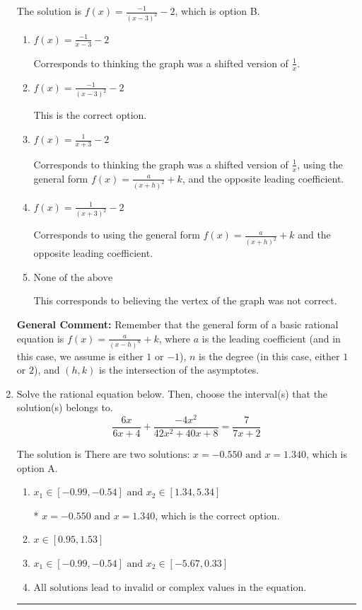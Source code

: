\documentclass{extbook}[14pt]
\newcommand{\litem}[1]{\item #1

\rule{\textwidth}{0.4pt}}
\begin{document}
\begin{enumerate}
{The solution is \( f(x) = \frac{-1}{(x - 3)^2} - 2 \), which is option B.\begin{enumerate}[label=\Alph*.]
\item \( f(x) = \frac{-1}{x - 3} - 2 \)

Corresponds to thinking the graph was a shifted version of $\frac{1}{x}$.
\item \( f(x) = \frac{-1}{(x - 3)^2} - 2 \)

This is the correct option.
\item \( f(x) = \frac{1}{x + 3} - 2 \)

Corresponds to thinking the graph was a shifted version of $\frac{1}{x}$, using the general form $f(x) = \frac{a}{(x+h)^2}+k$, and the opposite leading coefficient.
\item \( f(x) = \frac{1}{(x + 3)^2} - 2 \)

Corresponds to using the general form $f(x) = \frac{a}{(x+h)^2}+k$ and the opposite leading coefficient.
\item \( \text{None of the above} \)

This corresponds to believing the vertex of the graph was not correct.
\end{enumerate}

\textbf{General Comment:} Remember that the general form of a basic rational equation is $ f(x) = \frac{a}{(x-h)^n} + k$, where $a$ is the leading coefficient (and in this case, we assume is either $1$ or $-1$), $n$ is the degree (in this case, either $1$ or $2$), and $(h, k)$ is the intersection of the asymptotes.
}
\litem{
Solve the rational equation below. Then, choose the interval(s) that the solution(s) belongs to.
\[ \frac{6x}{6x + 4} + \frac{-4x^{2}}{42x^{2} +40 x + 8} = \frac{7}{7x + 2} \]

The solution is \( \text{There are two solutions: } x = -0.550 \text{ and } x = 1.340 \), which is option A.\begin{enumerate}[label=\Alph*.]
\item \( x_1 \in [-0.99, -0.54] \text{ and } x_2 \in [1.34,5.34] \)

* $x = -0.550 \text{ and } x = 1.340$, which is the correct option.
\item \( x \in [0.95,1.53] \)


\item \( x_1 \in [-0.99, -0.54] \text{ and } x_2 \in [-5.67,0.33] \)


\item \( \text{All solutions lead to invalid or complex values in the equation.} \)



\end{enumerate}}
\end{enumerate}
\end{document}
